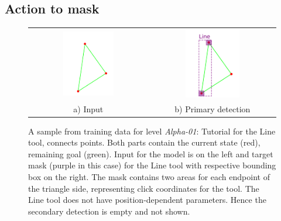 \subsection{Action to mask}
\label{action_to_mask}
\begin{figure}[h]
\centering
\begin{tabular}{c c}
\includegraphics[width=0.45\textwidth]{img/ExampleTrainingData/01_01_input.png} &
\includegraphics[width=0.45\textwidth]{img/ExampleTrainingData/01_01_primary.png} \\
a) Input & b) Primary detection
\end{tabular}
\caption{A sample from training data for level \textit{Alpha-01}: Tutorial for the Line tool, connects points. Both parts contain the current state (red), remaining goal (green).
Input for the model is on the left and target mask (purple in this case) for the Line tool with respective bounding box on the right. The mask contains two areas for each endpoint of the triangle side, representing click coordinates for the tool. The Line tool does not have position-dependent parameters. Hence the secondary detection is empty and not shown.}
\label{training_data_primary_01_01}
\end{figure}
